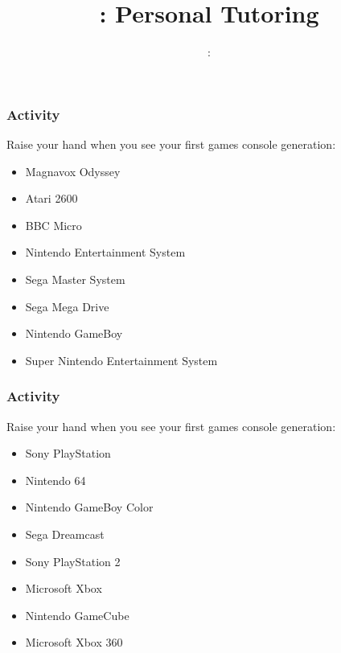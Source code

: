 \usepackage{../../beamerthemeFalmouthGamesAcademy}
\usepackage{multimedia}
\graphicspath{ {../../} }


\usepackage[normalem]{ulem}
\usepackage{wasysym}

\usepackage{pdfpages}

\usetikzlibrary{arrows,automata}




\title{\sessionnumber: Personal Tutoring}
\subtitle{\modulecode: \moduletitle}

\frame{\titlepage} 

\begin{frame}
	\frametitle{Activity}
	
	Raise your hand when you see your first games console generation:  \pause
	
	\begin{itemize}
		\item Magnavox Odyssey \pause
		\item Atari 2600 \pause
		\item BBC Micro \pause
		\item Nintendo Entertainment System \pause
		\item Sega Master System \pause
		\item Sega Mega Drive \pause
		\item Nintendo GameBoy \pause
		\item Super Nintendo Entertainment System

	\end{itemize}
\end{frame}

\begin{frame}
	\frametitle{Activity}
	
	Raise your hand when you see your first games console generation:
	
	\begin{itemize}
		\item Sony PlayStation \pause
		\item Nintendo 64 \pause
		\item Nintendo GameBoy Color \pause
		\item Sega Dreamcast \pause
		\item Sony PlayStation 2 \pause
		\item Microsoft Xbox \pause
		\item Nintendo GameCube \pause
		\item Microsoft Xbox 360 
	\end{itemize}
\end{frame}

